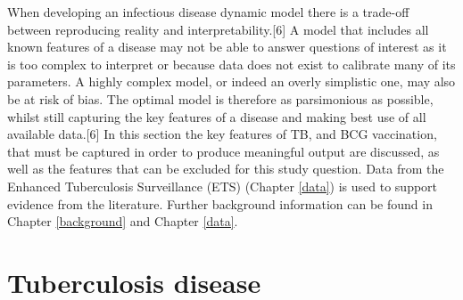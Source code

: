 \documentclass[11pt,twoside]{bristolthesis}
\begin{document}
  When developing an infectious disease dynamic model there is a trade-off between reproducing reality and interpretability.{[}6{]} A model that includes all known features of a disease may not be able to answer questions of interest as it is too complex to interpret or because data does not exist to calibrate many of its parameters. A highly complex model, or indeed an overly simplistic one, may also be at risk of bias. The optimal model is therefore as parsimonious as possible, whilst still capturing the key features of a disease and making best use of all available data.{[}6{]} In this section the key features of TB, and BCG vaccination, that must be captured in order to produce meaningful output are discussed, as well as the features that can be excluded for this study question. Data from the Enhanced Tuberculosis Surveillance (ETS) (Chapter \ref{data}) is used to support evidence from the literature. Further background information can be found in Chapter \ref{background} and Chapter \ref{data}.
  
  \hypertarget{tuberculosis-disease}{%
  \section{Tuberculosis disease}\label{tuberculosis-disease}}
  
\end{document}
